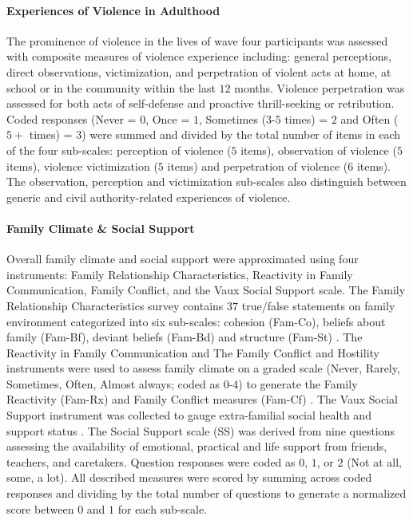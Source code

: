 \documentclass[utf8]{article}
\begin{document}
\paragraph{Experiences of Violence in Adulthood} The prominence of violence in the lives of wave four participants was assessed with composite measures of violence experience including: general perceptions, direct observations, victimization, and perpetration of violent acts at home, at school or in the community within the last $12$ months. Violence perpetration was assessed for both acts of self-defense and proactive thrill-seeking or retribution. Coded responses (Never = $0$, Once = $1$, Sometimes ($3$-$5$ times) = $2$ and Often ($5+$ times) = $3$) were summed and divided by the total number of items in each of the four sub-scales: perception of violence ($5$ items), observation of violence ($5$ items), violence victimization ($5$ items) and perpetration of violence ($6$ items). The observation, perception and victimization sub-scales also distinguish between generic and civil authority-related experiences of violence. 
\paragraph{Family Climate \& Social Support}
Overall family climate and social support were approximated using four instruments: Family Relationship Characteristics, Reactivity in Family Communication, Family Conflict, and the Vaux Social Support scale. The Family Relationship Characteristics survey contains $37$ true/false statements on family environment categorized into six sub-scales: cohesion (Fam-Co), beliefs about family (Fam-Bf), deviant beliefs (Fam-Bd) and structure (Fam-St) \citep{tolan1997assessment}. The Reactivity in Family Communication and The Family Conflict and Hostility instruments were used to assess family climate on a graded scale (Never, Rarely, Sometimes, Often, Almost always; coded as 0-4) to generate the Family Reactivity (Fam-Rx) and Family Conflict measures (Fam-Cf) \citep{thornberry2003gangs,henry2004study}. The Vaux Social Support instrument was collected to gauge extra-familial social health and support status \citep{vaux1988social}. The Social Support scale (SS) was derived from nine questions assessing the availability of emotional, practical and life support from friends, teachers, and caretakers. Question responses were coded as $0$, $1$, or $2$ (Not at all, some, a lot). All described measures were scored by summing across coded responses and dividing by the total number of questions to generate a normalized score between $0$ and $1$ for each sub-scale.
\end{document}
